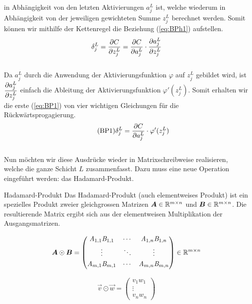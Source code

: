 in Abhängigkeit von den letzten Aktivierungen $a_j^L$ ist, welche wiederum in
Abhängigkeit von der jeweiligen gewichteten Summe $z_j^L$ berechnet werden.
Somit können wir mithilfe der Kettenregel die Beziehung (\ref{eq:BPh1}) aufstellen.
\\
\begin{equation}\label{eq:BPh1}
  \delta_j^L = \frac{\partial C}{\partial z_j^L} = \frac{\partial C}{\partial a_j^L} \cdot \frac{\partial a_j^L}{\partial z_j^L}
\end{equation}
\\
Da $a_j^L$ durch die Anwendung der Aktivierungsfunktion $\varphi$ auf $z_j^L$
gebildet wird, ist $\displaystyle\frac{\partial a_j^L}{\partial z_j^L}$ einfach die Ableitung der Aktivierungsfunktion
$\varphi'(z_j^L)$. Somit erhalten wir die erste (\ref{eq:BP1}) von vier
wichtigen Gleichungen für die Rückwärtsprogagierung.
\\
\begin{equation}\tag{BP1}\label{eq:BP1}
  \delta_j^L = \frac{\partial C}{\partial a_j^L} \cdot \varphi'(z_j^L)
\end{equation}
\\
Nun möchten wir diese Ausdrücke wieder in Matrixschreibweise realisieren,
welche die ganze Schicht $L$ zusammenfasst. Dazu
muss eine neue Operation eingeführt werden: das Hadamard-Produkt.

\begin{defbox}{Hadamard-Produkt}
  Das Hadamard-Produkt (auch elementweises Produkt) ist ein spezielles Produkt zweier gleichgrossen Matrizen
  $\bm{A} \in \mathbb{R}^{m \times n}$ und $\bm{B} \in \mathbb{R}^{m \times n}$.
  Die resultierende Matrix ergibt sich aus der elementweisen Multiplikation der Ausgangsmatrizen.

  \begin{minipage}{0.5\textwidth}
    \begin{equation*}
      \bm{A} \odot \bm{B} =
      \begin{pmatrix}
        \mathit{A}_{1,1} \mathit{B}_{1,1} & \cdots & \mathit{A}_{1,n} \mathit{B}_{1,n} \\[0.3em]
        \vdots & \ddots & \vdots \\[0.3em]
        \mathit{A}_{m,1} \mathit{B}_{m,1} & \cdots & \mathit{A}_{m,n} \mathit{B}_{m,n} \\[0.3em]
      \end{pmatrix}
      \in \mathbb{R}^{m \times n}
    \end{equation*}
  \end{minipage}
  \begin{minipage}{0.5\textwidth}
    \begin{equation*}
      \vec{v} \odot \vec{w} =
      \begin{pmatrix}
        v_1 w_1 \\
        \vdots \\
        v_n w_n
      \end{pmatrix}
    \end{equation*}

  \end{minipage}
\end{defbox}
\para{}

